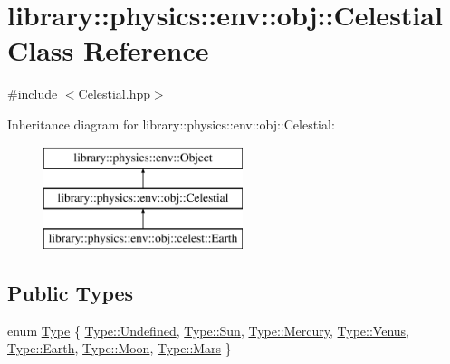 \hypertarget{classlibrary_1_1physics_1_1env_1_1obj_1_1_celestial}{}\section{library\+:\+:physics\+:\+:env\+:\+:obj\+:\+:Celestial Class Reference}
\label{classlibrary_1_1physics_1_1env_1_1obj_1_1_celestial}


{\ttfamily \#include $<$Celestial.\+hpp$>$}

Inheritance diagram for library\+:\+:physics\+:\+:env\+:\+:obj\+:\+:Celestial\+:\begin{figure}[H]
\begin{center}
\leavevmode
\includegraphics[height=3.000000cm]{classlibrary_1_1physics_1_1env_1_1obj_1_1_celestial}
\end{center}
\end{figure}
\subsection*{Public Types}
\begin{DoxyCompactItemize}
\item 
enum \hyperlink{classlibrary_1_1physics_1_1env_1_1obj_1_1_celestial_aab1f58aa727e639288d65f3d33c4f245}{Type} \{ \newline
\hyperlink{classlibrary_1_1physics_1_1env_1_1obj_1_1_celestial_aab1f58aa727e639288d65f3d33c4f245aec0fc0100c4fc1ce4eea230c3dc10360}{Type\+::\+Undefined}, 
\hyperlink{classlibrary_1_1physics_1_1env_1_1obj_1_1_celestial_aab1f58aa727e639288d65f3d33c4f245aef6572e4cd58bb39a3f4e82fc64fe9f0}{Type\+::\+Sun}, 
\hyperlink{classlibrary_1_1physics_1_1env_1_1obj_1_1_celestial_aab1f58aa727e639288d65f3d33c4f245a34dae487e31f37aa74633258b7774d4f}{Type\+::\+Mercury}, 
\hyperlink{classlibrary_1_1physics_1_1env_1_1obj_1_1_celestial_aab1f58aa727e639288d65f3d33c4f245a0bdc508a17811a3a860d32749ad44e4b}{Type\+::\+Venus}, 
\newline
\hyperlink{classlibrary_1_1physics_1_1env_1_1obj_1_1_celestial_aab1f58aa727e639288d65f3d33c4f245a5cdd21c97f86686cc505e02fd32a7523}{Type\+::\+Earth}, 
\hyperlink{classlibrary_1_1physics_1_1env_1_1obj_1_1_celestial_aab1f58aa727e639288d65f3d33c4f245ad502a50ed945d5fca74e0105575b5b34}{Type\+::\+Moon}, 
\hyperlink{classlibrary_1_1physics_1_1env_1_1obj_1_1_celestial_aab1f58aa727e639288d65f3d33c4f245a671f028142280b556a85ffdd90e0a43d}{Type\+::\+Mars}
 \}
\end{DoxyCompactItemize}
